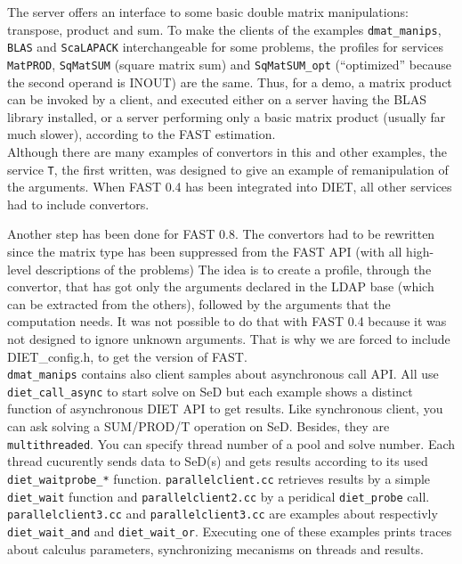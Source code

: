         The server offers an interface to some basic double matrix manipulations:
        transpose, product and sum. To make the clients of the examples
        \texttt{dmat\_manips}, \texttt{BLAS} and \texttt{ScaLAPACK} interchangeable for
        some problems, the profiles for services \texttt{MatPROD}, \texttt{SqMatSUM}
        (square matrix sum) and \texttt{SqMatSUM\_opt} (``optimized'' because the second
                                                        operand is INOUT) are the same. Thus, for a demo, a matrix product can be
        invoked by a client, and executed either on a server having the BLAS library
        installed, or a server performing only a basic matrix product (usually far much
            slower), according to the FAST estimation.
        \\

        Although there are many examples of convertors in this and other examples, the
        service \texttt{T}, the first written, was designed to give an example of
        remanipulation of the arguments. When FAST 0.4 has been integrated into DIET,
        all other services had to include convertors.

        Another step has been done for FAST 0.8. The convertors had to be rewritten
        since the matrix type has been suppressed from the FAST API (with all high-level
            descriptions of the problems) The idea is to create a profile, through the
        convertor, that has got only the arguments declared in the LDAP base (which can
            be extracted from the others), followed by the arguments that the computation
        needs. It was not possible to do that with FAST 0.4 because it was not designed
        to ignore unknown arguments. That is why we are forced to include
        \textsf{DIET\_config.h}, to get the version of FAST.
        \\

        \texttt{dmat\_manips} contains also client samples about asynchronous call API. All
        use \texttt{diet\_call\_async} to start solve on SeD but each example shows
        a distinct function of asynchronous DIET API to get results. Like synchronous
        client, you can ask solving a SUM/PROD/T operation on SeD. Besides, they are
        \texttt{multithreaded}. You can specify thread number of a pool and solve number. Each
        thread cucurently sends data to SeD(s) and gets results according to its used
        \texttt{diet\_wait\/probe\_*} function.
        \texttt{parallelclient.cc} retrieves results by a simple \texttt{diet\_wait} function
        and \texttt{parallelclient2.cc} by a peridical \texttt{diet\_probe} call.
        \texttt{parallelclient3.cc} and \texttt{parallelclient3.cc} are examples about
        respectivly \texttt{diet\_wait\_and} and \texttt{diet\_wait\_or}. Executing
        one of these examples prints traces about calculus parameters, synchronizing
        mecanisms on threads and results.

